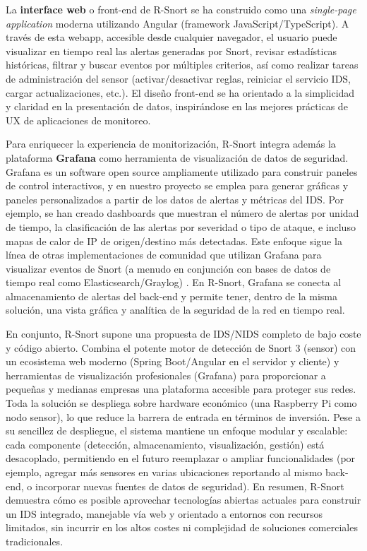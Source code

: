 \documentclass[11pt,a4paper,twoside]{report}
\begin{document}
La \textbf{interface web} o front-end de R-Snort se ha construido como una \textit{single-page application} moderna utilizando Angular (framework JavaScript/TypeScript). A través de esta webapp, accesible desde cualquier navegador, el usuario puede visualizar en tiempo real las alertas generadas por Snort, revisar estadísticas históricas, filtrar y buscar eventos por múltiples criterios, así como realizar tareas de administración del sensor (activar/desactivar reglas, reiniciar el servicio IDS, cargar actualizaciones, etc.). El diseño front-end se ha orientado a la simplicidad y claridad en la presentación de datos, inspirándose en las mejores prácticas de UX de aplicaciones de monitoreo.\newline

Para enriquecer la experiencia de monitorización, R-Snort integra además la plataforma \textbf{Grafana} como herramienta de visualización de datos de seguridad. Grafana es un software open source ampliamente utilizado para construir paneles de control interactivos, y en nuestro proyecto se emplea para generar gráficas y paneles personalizados a partir de los datos de alertas y métricas del IDS. Por ejemplo, se han creado dashboards que muestran el número de alertas por unidad de tiempo, la clasificación de las alertas por severidad o tipo de ataque, e incluso mapas de calor de IP de origen/destino más detectadas. Este enfoque sigue la línea de otras implementaciones de comunidad que utilizan Grafana para visualizar eventos de Snort (a menudo en conjunción con bases de datos de tiempo real como Elasticsearch/Graylog) \cite{GrafanaForum2020}. En R-Snort, Grafana se conecta al almacenamiento de alertas del back-end y permite tener, dentro de la misma solución, una vista gráfica y analítica de la seguridad de la red en tiempo real.\newline

En conjunto, R-Snort supone una propuesta de IDS/NIDS completo de bajo coste y código abierto. Combina el potente motor de detección de Snort 3 (sensor) con un ecosistema web moderno (Spring Boot/Angular en el servidor y cliente) y herramientas de visualización profesionales (Grafana) para proporcionar a pequeñas y medianas empresas una plataforma accesible para proteger sus redes. Toda la solución se despliega sobre hardware económico (una Raspberry Pi como nodo sensor), lo que reduce la barrera de entrada en términos de inversión. Pese a su sencillez de despliegue, el sistema mantiene un enfoque modular y escalable: cada componente (detección, almacenamiento, visualización, gestión) está desacoplado, permitiendo en el futuro reemplazar o ampliar funcionalidades (por ejemplo, agregar más sensores en varias ubicaciones reportando al mismo back-end, o incorporar nuevas fuentes de datos de seguridad). En resumen, R-Snort demuestra cómo es posible aprovechar tecnologías abiertas actuales para construir un IDS integrado, manejable vía web y orientado a entornos con recursos limitados, sin incurrir en los altos costes ni complejidad de soluciones comerciales tradicionales.
\end{document}
